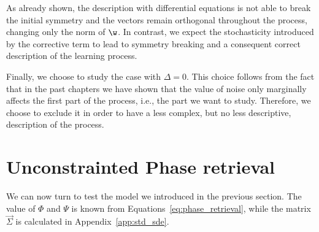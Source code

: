 As already shown, the description with differential equations is not able to break the initial symmetry and the vectors remain orthogonal throughout the process,
changing only the norm of \(\w\).
In contrast, we expect the stochasticity introduced by the corrective term to lead to symmetry breaking and a consequent correct description of the learning process.

Finally, we choose to study the case with \(\Delta=0\). 
This choice follows from the fact that in the past chapters we have shown that the value of noise only marginally affects the first part of the process,
i.e., the part we want to study. Therefore, we choose to exclude it in order to have a less complex,
but no less descriptive, description of the process.


\section{Unconstrainted Phase retrieval}
We can now turn to test the model we introduced in the previous section.
The value of \(\Phi\) and \(\Psi\) is known from Equations~\eqref{eq:phase_retrieval},
while the matrix \(\vec{\Sigma}\) is calculated in Appendix~\ref{app:std_sde}.

